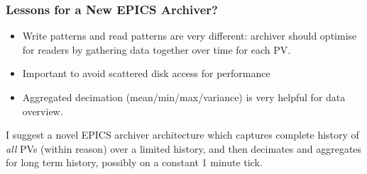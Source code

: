 \documentclass{beamer}
\begin{document}
\begin{frame}\frametitle{Lessons for a New EPICS Archiver?}
\begin{itemize}
\item Write patterns and read patterns are very different: archiver should
optimise for readers by gathering data together over time for each PV.
\item Important to avoid scattered disk access for performance
\item Aggregated decimation (mean/min/max/variance) is very helpful for data
overview.
\end{itemize}
I suggest a novel EPICS archiver architecture which captures complete history of
\emph{all} PVs (within reason) over a limited history, and then decimates and
aggregates for long term history, possibly on a constant 1 minute tick.
\end{frame}

\end{document}
